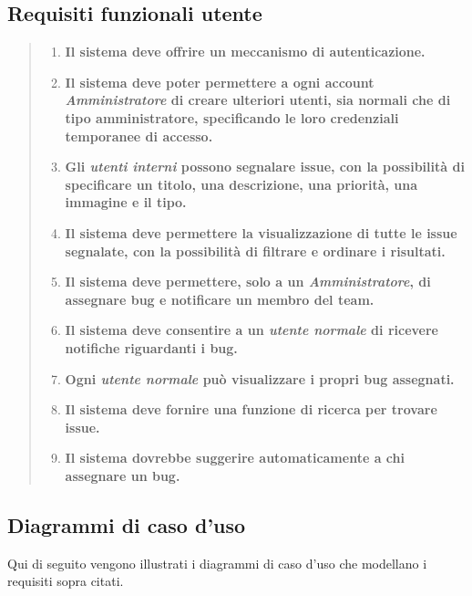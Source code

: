 \subsection{Requisiti funzionali utente}
\begin{quote}
\begin{enumerate}[label=\textit{RF\arabic*}]
  \item \textbf{Il sistema deve offrire un meccanismo di autenticazione.}
    
  \item \textbf{Il sistema deve poter permettere a ogni account \textit{Amministratore} di creare ulteriori utenti, sia normali che di tipo amministratore, specificando le loro credenziali temporanee di accesso. }
  
  \item \textbf{Gli \textit{utenti interni} possono segnalare issue, con la possibilità di specificare un titolo, una descrizione, una priorità, una immagine e il tipo.}
  
  \item \textbf{Il sistema deve permettere la visualizzazione di tutte le issue segnalate, con la possibilità di filtrare e ordinare i risultati.}
  
  \item \textbf{Il sistema deve permettere, solo a un \textit{Amministratore}, di assegnare bug e notificare un membro del team.}
  
  \item \textbf{Il sistema deve consentire a un \textit{utente normale} di ricevere notifiche riguardanti i bug.}

  \item \textbf{Ogni \textit{utente normale} può visualizzare i propri bug assegnati.}

  \item \textbf{Il sistema deve fornire una funzione di ricerca per trovare issue.}

  \item \textbf{Il sistema dovrebbe suggerire  automaticamente a chi assegnare un bug.}
  
\end{enumerate} 
\end{quote}

\subsection{Diagrammi di caso d'uso} 

Qui di seguito vengono illustrati i diagrammi di caso d'uso che modellano i requisiti sopra citati.

